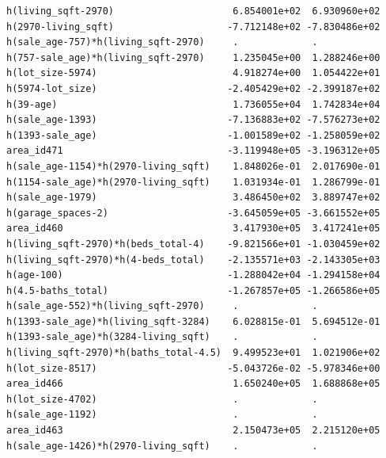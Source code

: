 \documentclass[
]{article}
\begin{document}
\begin{verbatim}
h(living_sqft-2970)                     6.854001e+02  6.930960e+02
h(2970-living_sqft)                    -7.712148e+02 -7.830486e+02
h(sale_age-757)*h(living_sqft-2970)     .             .           
h(757-sale_age)*h(living_sqft-2970)     1.235045e+00  1.288246e+00
h(lot_size-5974)                        4.918274e+00  1.054422e+01
h(5974-lot_size)                       -2.405429e+02 -2.399187e+02
h(39-age)                               1.736055e+04  1.742834e+04
h(sale_age-1393)                       -7.136883e+02 -7.576273e+02
h(1393-sale_age)                       -1.001589e+02 -1.258059e+02
area_id471                             -3.119948e+05 -3.196312e+05
h(sale_age-1154)*h(2970-living_sqft)    1.848026e-01  2.017690e-01
h(1154-sale_age)*h(2970-living_sqft)    1.031934e-01  1.286799e-01
h(sale_age-1979)                        3.486450e+02  3.889747e+02
h(garage_spaces-2)                     -3.645059e+05 -3.661552e+05
area_id460                              3.417930e+05  3.417241e+05
h(living_sqft-2970)*h(beds_total-4)    -9.821566e+01 -1.030459e+02
h(living_sqft-2970)*h(4-beds_total)    -2.135571e+03 -2.143305e+03
h(age-100)                             -1.288042e+04 -1.294158e+04
h(4.5-baths_total)                     -1.267857e+05 -1.266586e+05
h(sale_age-552)*h(living_sqft-2970)     .             .           
h(1393-sale_age)*h(living_sqft-3284)    6.028815e-01  5.694512e-01
h(1393-sale_age)*h(3284-living_sqft)    .             .           
h(living_sqft-2970)*h(baths_total-4.5)  9.499523e+01  1.021906e+02
h(lot_size-8517)                       -5.043726e-02 -5.978346e+00
area_id466                              1.650240e+05  1.688868e+05
h(lot_size-4702)                        .             .           
h(sale_age-1192)                        .             .           
area_id463                              2.150473e+05  2.215120e+05
h(sale_age-1426)*h(2970-living_sqft)    .             .           
                                                                  

\end{verbatim}
\end{document}
